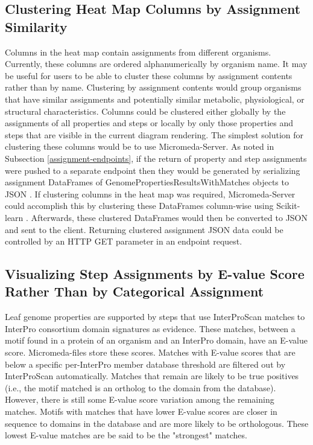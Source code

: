 \subsection{Clustering Heat Map Columns by Assignment Similarity}

Columns in the heat map contain assignments from different organisms. Currently, these columns are ordered alphanumerically by organism name. It may be useful for users to be able to cluster these columns by assignment contents rather than by name. Clustering by assignment contents would group organisms that have similar assignments and potentially similar metabolic, physiological, or structural characteristics. Columns could be clustered either globally by the assignments of all properties and steps or locally by only those properties and steps that are visible in the current diagram rendering. The simplest solution for clustering these columns would be to use Micromeda-Server. As noted in Subsection \ref{assignment-endpoints}, if the return of property and step assignments were pushed to a separate endpoint then they would be generated by serializing assignment DataFrames of GenomePropertiesResultsWithMatches objects to JSON \cite{bray2014rfc}. If clustering columns in the heat map was required, Micromeda-Server could accomplish this by clustering these DataFrames column-wise using Scikit-learn \cite{pedregosa2011scikit}. Afterwards, these clustered DataFrames would then be converted to JSON and sent to the client. Returning clustered assignment JSON data could be controlled by an HTTP GET parameter in an endpoint request.

\subsection{Visualizing Step Assignments by E-value Score Rather Than by Categorical Assignment} \label{interface-e-value}

Leaf genome properties are supported by steps that use InterProScan matches to InterPro consortium domain signatures as evidence. These matches, between a motif found in a protein of an organism and an InterPro domain, have an E-value score. Micromeda-files store these scores. Matches with E-value scores that are below a specific per-InterPro member database threshold are filtered out by InterProScan automatically. Matches that remain are likely to be true positives (i.e., the motif matched is an ortholog to the domain from the database). However, there is still some E-value score variation among the remaining matches. Motifs with matches that have lower E-value scores are closer in sequence to domains in the database and are more likely to be orthologous. These lowest E-value matches are be said to be the "strongest" matches.

